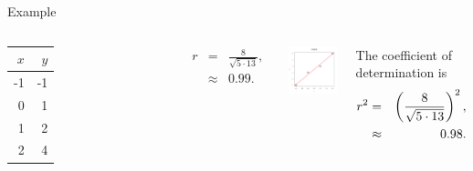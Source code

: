 \begin{frame}{Example}
  
  \begin{columns}
    \begin{tabular}{r|r}
      $x$ & $y$ \\ \hline
      -1 & -1 \\
      0 & 1 \\
      1 & 2 \\
      2 & 4
    \end{tabular}

    \begin{eqnarray*}
      r       & = & \frac{8}{\sqrt{5\cdot 13}}, \\
      & \approx & 0.99.
    \end{eqnarray*}



    \centerline{\includegraphics[width=4cm]{img/coefDetLine}}


    The coefficient of determination is
    \begin{eqnarray*}
      r^2 & = & \left( \frac{8}{\sqrt{5\cdot 13}} \right)^2, \\
      & \approx & 0.98.
    \end{eqnarray*}


    \end{columns}

\end{frame}


